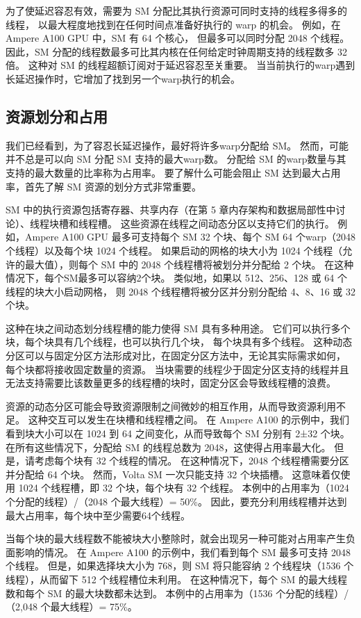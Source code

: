 为了使延迟容忍有效，需要为 SM 分配比其执行资源可同时支持的线程多得多的线程，
以最大程度地找到在任何时间点准备好执行的 warp 的机会。 例如，在 Ampere A100 GPU 中，SM 有 64 个核心，
但最多可以同时分配 2048 个线程。 因此，SM 分配的线程数最多可比其内核在任何给定时钟周期支持的线程数多 32 倍。 
这种对 SM 的线程超额订阅对于延迟容忍至关重要。 当当前执行的warp遇到长延迟操作时，它增加了找到另一个warp执行的机会。

\subsection{资源划分和占用}
我们已经看到，为了容忍长延迟操作，最好将许多warp分配给 SM。 然而，可能并不总是可以向 SM 分配 SM 支持的最大warp数。 
分配给 SM 的warp数量与其支持的最大数量的比率称为占用率。 
要了解什么可能会阻止 SM 达到最大占用率，首先了解 SM 资源的划分方式非常重要。

SM 中的执行资源包括寄存器、共享内存（在第 5 章内存架构和数据局部性中讨论）、线程块槽和线程槽。 
这些资源在线程之间动态分区以支持它们的执行。 
例如，Ampere A100 GPU 最多可支持每个 SM 32 个块、每个 SM 64 个warp（2048 个线程）以及每个块 1024 个线程。 
如果启动的网格的块大小为 1024 个线程（允许的最大值），则每个 SM 中的 2048 个线程槽将被划分并分配给 2 个块。 
在这种情况下，每个SM最多可以容纳2个块。 类似地，如果以 512、256、128 或 64 个线程的块大小启动网格，
则 2048 个线程槽将被分区并分别分配给 4、8、16 或 32 个块。

这种在块之间动态划分线程槽的能力使得 SM 具有多种用途。 它们可以执行多个块，每个块具有几个线程，也可以执行几个块，
每个块具有多个线程。 这种动态分区可以与固定分区方法形成对比，在固定分区方法中，无论其实际需求如何，
每个块都将接收固定数量的资源。 当块需要的线程少于固定分区支持的线程并且无法支持需要比该数量更多的线程槽的块时，固定分区会导致线程槽的浪费。

资源的动态分区可能会导致资源限制之间微妙的相互作用，从而导致资源利用不足。 这种交互可以发生在块槽和线程槽之间。 
在 Ampere A100 的示例中，我们看到块大小可以在 1024 到 64 之间变化，从而导致每个 SM 分别有 2±32 个块。 
在所有这些情况下，分配给 SM 的线程总数为 2048，这使得占用率最大化。 但是，请考虑每个块有 32 个线程的情况。 
在这种情况下，2048 个线程槽需要分区并分配给 64 个块。 然而，Volta SM 一次只能支持 32 个块插槽。 
这意味着仅使用 1024 个线程槽，即 32 个块，每个块有 32 个线程。 
本例中的占用率为（1024 个分配的线程）/（2048 个最大线程）= 50\%。 
因此，要充分利用线程槽并达到最大占用率，每个块中至少需要64个线程。

当每个块的最大线程数不能被块大小整除时，就会出现另一种可能对占用率产生负面影响的情况。 
在 Ampere A100 的示例中，我们看到每个 SM 最多可支持 2048 个线程。 
但是，如果选择块大小为 768，则 SM 将只能容纳 2 个线程块（1536 个线程），从而留下 512 个线程槽位未利用。 
在这种情况下，每个 SM 的最大线程数和每个 SM 的最大块数都未达到。 
本例中的占用率为（1536 个分配的线程）/（2,048 个最大线程）= 75\%。

